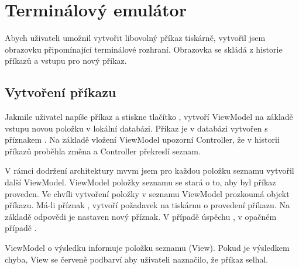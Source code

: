 \section{Terminálový emulátor}

Abych uživateli umožnil vytvořit libovolný příkaz tiskárně, vytvořil jsem obrazovku připomínající terminálové rozhraní.
Obrazovka se skládá z historie příkazů a vstupu pro nový příkaz.

\subsection{Vytvoření příkazu}

Jakmile uživatel napíše příkaz a stiskne tlačítko , vytvoří ViewModel na základě vstupu novou položku v lokální databázi.
Příkaz je v databázi vytvořen s příznakem .
Na základě vložení ViewModel upozorní Controller, že v historii příkazů proběhla změna a Controller překreslí seznam.

V rámci dodržení architektury \acrshort{mvvm} jsem pro každou položku seznamu vytvořil další ViewModel.
ViewModel položky seznamu se stará o to, aby byl příkaz proveden.
Ve chvíli vytvoření položky v seznamu ViewModel prozkoumá objekt příkazu.
Má-li příznak , vytvoří požadavek na tiskárnu o provedení příkazu.
Na základě odpovědi je nastaven nový příznak.
V případě úspěchu , v opačném případě .

ViewModel o výsledku informuje položku seznamu (View).
Pokud je výsledkem chyba, View se červeně podbarví aby uživateli naznačilo, že příkaz selhal.
